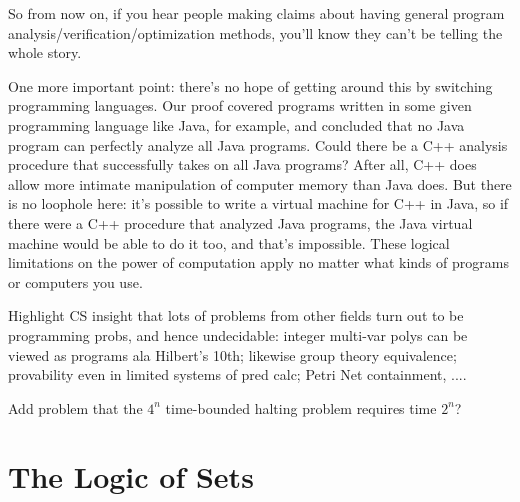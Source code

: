 So from now on, if you hear people making claims about having general
program analysis/verification/optimization methods, you'll know they can't
be telling the whole story.

One more important point: there's no hope of getting around this by
switching programming languages.  Our proof covered programs written
in some given programming language like Java, for example, and
concluded that no Java program can perfectly analyze all Java
programs.  Could there be a C++ analysis procedure that successfully
takes on all Java programs?  After all, C++ does allow more intimate
manipulation of computer memory than Java does.  But there is no
loophole here: it's possible to write a virtual machine for C++ in
Java, so if there were a C++ procedure that analyzed Java programs,
the Java virtual machine would be able to do it too, and that's
impossible.  These logical limitations on the power of computation
apply no matter what kinds of programs or computers you use.

\begin{editingnotes}
Highlight CS insight that lots of problems from other fields turn out
to be programming probs, and hence undecidable: integer
multi-var polys can be viewed as programs ala Hilbert's 10th; likewise
group theory equivalence; provability even in limited systems of pred
calc; Petri Net containment, ....
\end{editingnotes}

\begin{problems}

\classproblems
{}

\homeworkproblems
{}

\begin{editingnotes}
Add problem that the $4^n$ time-bounded halting problem requires time
$2^n$?
\end{editingnotes}

\examproblems
{}

\end{problems}

\section{The Logic of Sets}\label{set_logic_sec}%

